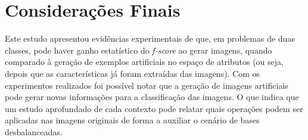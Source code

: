 \section{Considerações Finais}

Este estudo apresentou evidências experimentais de que, em problemas de duas classes, pode haver ganho estatístico do \textit{f-score} ao gerar imagens, quando comparado à geração de exemplos artificiais no espaço de atributos (ou seja, depois que as características já foram extraídas das imagens).  Com os experimentos realizados foi possível notar que a geração de imagens artificiais pode gerar novas informações para a classificação das imagens. O que indica que um estudo aprofundado de cada contexto pode relatar quais operações podem ser aplicadas nas imagens originais de forma a auxiliar o cenário de bases desbalanceadas.
